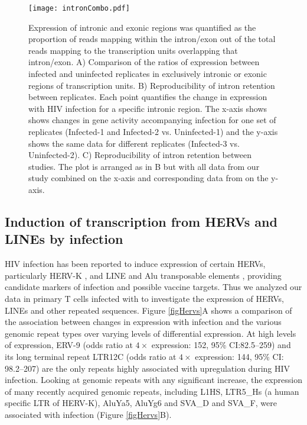 \documentclass[../sherrill-Mix_thesis.tex]{subfiles}
\begin{document}
		\begin{figure}
			\centering
				\texttt{[image: intronCombo.pdf]}
			\caption[Changes in the abundance of intronic regions with HIV infection.]{Expression of intronic and exonic regions was quantified as the proportion of reads mapping within the intron/exon out of the total reads mapping to the transcription units overlapping that intron/exon. A) Comparison of the ratios of expression between infected and uninfected replicates in exclusively intronic or exonic regions of transcription units. B) Reproducibility of intron retention between replicates. Each point quantifies the change in expression with HIV infection for a specific intronic region. The x-axis shows shows changes in gene activity accompanying infection for one set of replicates (Infected-1 and Infected-2 vs. Uninfected-1) and the y-axis shows the same data for different replicates (Infected-3 vs. Uninfected-2). C) Reproducibility of intron retention between studies. The plot is arranged as in B but with all data from our study combined on the x-axis and corresponding data from \citet{Chang2011} on the y-axis.}
			\label{figIntron}
		\end{figure}

	\subsection{Induction of transcription from HERVs and LINEs by \hivEight{} infection}
		HIV infection has been reported to induce expression of certain HERVs, particularly HERV-K \citep{Contreras-Galindo2007,Contreras-Galindo2013,Bhardwaj2014}, and LINE and Alu transposable elements \citep{Jones2013}, providing candidate markers of infection and possible vaccine targets.  Thus we analyzed our data in primary T cells infected with \hivEight{} to investigate the expression of HERVs, LINEs and other repeated sequences.  Figure \ref{figHervs}A shows a comparison of the association between changes in expression with \hivEight{} infection and the various genomic repeat types over varying levels of differential expression. At high levels of expression, ERV-9  (odds ratio at $4\times$ expression: 152, 95\% CI:82.5--259) and its long terminal repeat LTR12C  (odds ratio at $4\times$ expression: 144, 95\% CI: 98.2--207) are the only repeats highly associated with upregulation during HIV infection. Looking at genomic repeats with any significant increase, the expression of many recently acquired genomic repeats, including L1HS, LTR5\_Hs (a human specific LTR of HERV-K), AluYa5, AluYg6 and SVA\_D and SVA\_F, were associated with \hivEight{} infection (Figure \ref{figHervs}B). 
		
\end{document}

